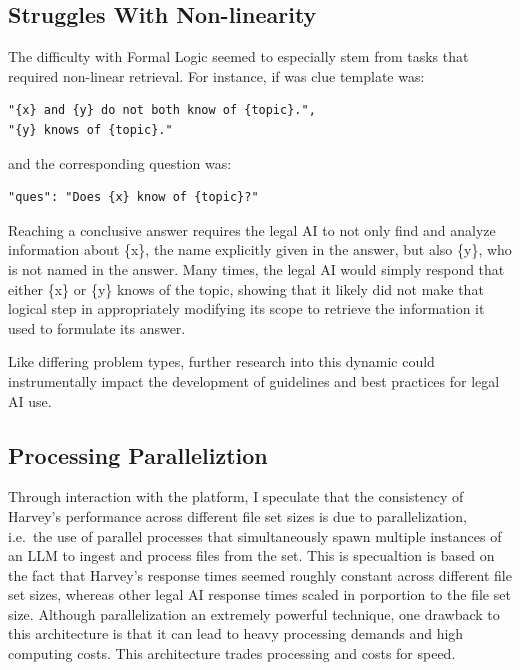 \documentclass[
]{article}
\begin{document}
\subsection{Struggles With
Non-linearity}\label{struggles-with-non-linearity}

The difficulty with Formal Logic seemed to especially stem from tasks
that required non-linear retrieval. For instance, if was clue template
was:

\begin{verbatim}
"{x} and {y} do not both know of {topic}.",
"{y} knows of {topic}."
\end{verbatim}

and the corresponding question was:

\begin{verbatim}
"ques": "Does {x} know of {topic}?"
\end{verbatim}

Reaching a conclusive answer requires the legal AI to not only find and
analyze information about \{x\}, the name explicitly given in the
answer, but also \{y\}, who is not named in the answer. Many times, the
legal AI would simply respond that either \{x\} or \{y\} knows of the
topic, showing that it likely did not make that logical step in
appropriately modifying its scope to retrieve the information it used to
formulate its answer.

Like differing problem types, further research into this dynamic could
instrumentally impact the development of guidelines and best practices
for legal AI use.

\subsection{Processing Paralleliztion}\label{processing-paralleliztion}

Through interaction with the platform, I speculate that the consistency
of Harvey's performance across different file set sizes is due to
parallelization, i.e.~the use of parallel processes that simultaneously
spawn multiple instances of an LLM to ingest and process files from the
set. This is specualtion is based on the fact that Harvey's response
times seemed roughly constant across different file set sizes, whereas
other legal AI response times scaled in porportion to the file set size.
Although parallelization an extremely powerful technique, one drawback
to this architecture is that it can lead to heavy processing demands and
high computing costs. This architecture trades processing and costs for
speed.
\end{document}
